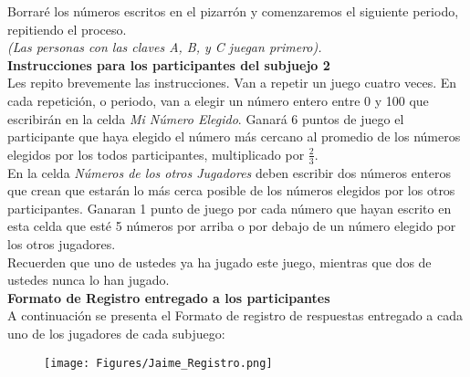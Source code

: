 Borraré los números escritos en el pizarrón y comenzaremos el siguiente periodo, repitiendo el proceso.\\

\textit{(Las personas con las claves A, B, y C juegan primero).}\\

\textbf{Instrucciones para los participantes del subjuejo 2}\\

Les repito brevemente las instrucciones. Van a repetir un juego cuatro veces. En cada repetición, o periodo, van a elegir un número entero entre 0 y 100 que escribirán en la celda \textit{Mi Número Elegido}. Ganará 6 puntos de juego el participante que haya elegido el número más cercano al promedio de los números elegidos por los todos participantes, multiplicado por $\frac{2}{3}$.\\

En la celda \textit{Números de los otros Jugadores} deben escribir dos números enteros que crean que estarán lo más cerca posible de los números elegidos por los otros participantes. Ganaran 1 punto de juego por cada número que hayan escrito en esta celda que esté 5 números por arriba o por debajo de un número elegido por los otros jugadores.\\

Recuerden que uno de ustedes ya ha jugado este juego, mientras que dos de ustedes nunca lo han jugado.\\


\textbf{Formato de Registro entregado a los participantes}\\

A continuación se presenta el Formato de registro de respuestas entregado a cada uno de los jugadores de cada subjuego:

\begin{figure}[th]
\centering
\texttt{[image: Figures/Jaime\_Registro.png]} 
\label{fig:csv}
\end{figure}
